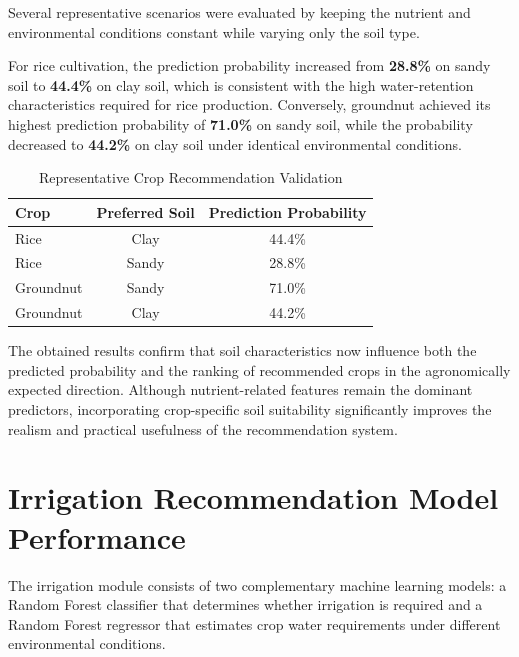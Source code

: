 Several representative scenarios were evaluated by keeping the nutrient and environmental conditions constant while varying only the soil type.

For rice cultivation, the prediction probability increased from \textbf{28.8\%} on sandy soil to \textbf{44.4\%} on clay soil, which is consistent with the high water-retention characteristics required for rice production. Conversely, groundnut achieved its highest prediction probability of \textbf{71.0\%} on sandy soil, while the probability decreased to \textbf{44.2\%} on clay soil under identical environmental conditions.

\begin{table}[H]
\centering
\caption{Representative Crop Recommendation Validation}
\label{tab:crop_examples}
\renewcommand{\arraystretch}{1.4}
\begin{tabular}{lcc}
\toprule
\textbf{Crop} & \textbf{Preferred Soil} & \textbf{Prediction Probability} \\
\midrule
Rice & Clay & 44.4\% \\
Rice & Sandy & 28.8\% \\
Groundnut & Sandy & 71.0\% \\
Groundnut & Clay & 44.2\% \\
\bottomrule
\end{tabular}
\end{table}

The obtained results confirm that soil characteristics now influence both the predicted probability and the ranking of recommended crops in the agronomically expected direction. Although nutrient-related features remain the dominant predictors, incorporating crop-specific soil suitability significantly improves the realism and practical usefulness of the recommendation system.

\section{Irrigation Recommendation Model Performance}
\label{sec:irrigation_results}

The irrigation module consists of two complementary machine learning models: a Random Forest classifier that determines whether irrigation is required and a Random Forest regressor that estimates crop water requirements under different environmental conditions.

